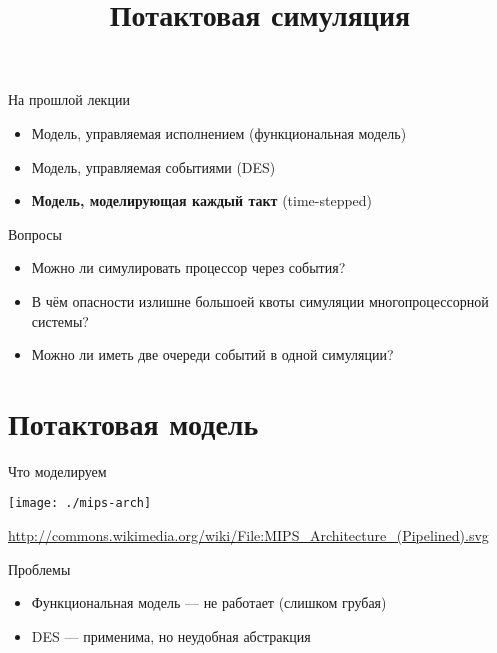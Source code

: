 
\title{Потактовая симуляция}



\begin{frame}
    \maketitle
\end{frame}

\begin{frame}
    \tableofcontents
\end{frame}

\begin{frame}{На прошлой лекции}
\begin{itemize}
    \item Модель, управляемая исполнением (функциональная модель)
    \item Модель, управляемая событиями (DES)\pause
    \item \textbf{Модель, моделирующая каждый такт} (time-stepped)
\end{itemize}
\end{frame}

\begin{frame}{Вопросы}
\begin{itemize}
\item Можно ли симулировать процессор через события?\pause
\item В чём опасности излишне большоей квоты симуляции многопроцессорной системы?\pause
\item Можно ли иметь две очереди событий в одной симуляции?
\end{itemize}

\end{frame}

\section{Потактовая модель}

\begin{frame}{Что моделируем}
\centering

\texttt{[image: ./mips-arch]}

\tiny{\url{http://commons.wikimedia.org/wiki/File:MIPS_Architecture_(Pipelined).svg}}
\end{frame}

\begin{frame}{Проблемы}
\begin{itemize}
    \item Функциональная модель — не работает (слишком грубая)
    \item DES — применима, но неудобная абстракция
\end{itemize}


\end{frame}

